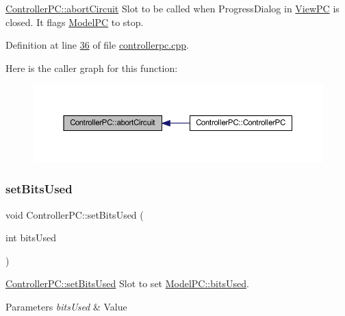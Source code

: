 \mbox{\hyperlink{class_controller_p_c_a8814989f7be1214e06b2e720889066b0}{Controller\+P\+C\+::abort\+Circuit}} Slot to be called when Progress\+Dialog in \mbox{\hyperlink{class_view_p_c}{View\+PC}} is closed. It flags \mbox{\hyperlink{class_model_p_c}{Model\+PC}} to stop. 



Definition at line \mbox{\hyperlink{controllerpc_8cpp_source_l00036}{36}} of file \mbox{\hyperlink{controllerpc_8cpp_source}{controllerpc.\+cpp}}.

Here is the caller graph for this function\+:
\nopagebreak
\begin{figure}[H]
\begin{center}
\leavevmode
\includegraphics[width=350pt]{class_controller_p_c_a8814989f7be1214e06b2e720889066b0_icgraph}
\end{center}
\end{figure}
\mbox{\label{class_controller_p_c_afd8d33ed84e463c5e0ce6715067003f3}} 
\subsubsection{\texorpdfstring{set\+Bits\+Used}{setBitsUsed}}
{\footnotesize\ttfamily void Controller\+P\+C\+::set\+Bits\+Used (\begin{DoxyParamCaption}\item[{int}]{bits\+Used }\end{DoxyParamCaption})\hspace{0.3cm}{\ttfamily [slot]}}



\mbox{\hyperlink{class_controller_p_c_afd8d33ed84e463c5e0ce6715067003f3}{Controller\+P\+C\+::set\+Bits\+Used}} Slot to set \mbox{\hyperlink{class_model_p_c_a655deb6a8afa94c7f4aadb3056989038}{Model\+P\+C\+::bits\+Used}}. 


\begin{DoxyParams}{Parameters}
{\em bits\+Used} & Value \\
\hline
\end{DoxyParams}


